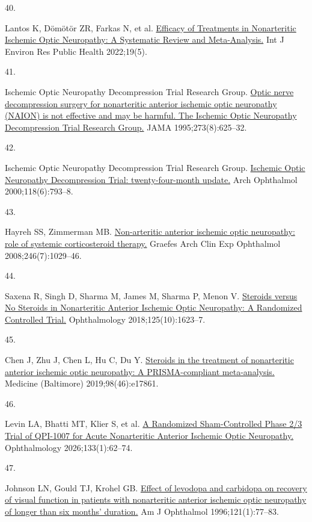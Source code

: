 \documentclass[
  11pt,
]{article}
\newlength{\cslhangindent}
\newlength{\csllabelwidth}
\newenvironment{CSLReferences}[2] %
 {\begin{list}{}{%
  \setlength{\itemindent}{0pt}
  \setlength{\leftmargin}{0pt}
  \setlength{\parsep}{0pt}
  \ifodd #1
   \setlength{\leftmargin}{\cslhangindent}
   \setlength{\itemindent}{-1\cslhangindent}
  \fi
  \setlength{\itemsep}{#2\baselineskip}}}
 {\end{list}}
\newcommand{\CSLLeftMargin}[1]{\parbox[t]{\csllabelwidth}{\strut#1\strut}}
\newcommand{\CSLRightInline}[1]{\parbox[t]{\linewidth - \csllabelwidth}{\strut#1\strut}}
\begin{document}
\begin{CSLReferences}{0}{1}
\CSLLeftMargin{40. }%
\CSLRightInline{Lantos K, Dömötör ZR, Farkas N, et al.
\href{https://doi.org/10.3390/ijerph19052718}{{Efficacy of Treatments in
Nonarteritic Ischemic Optic Neuropathy: A Systematic Review and
Meta-Analysis.}} Int J Environ Res Public Health 2022;19(5). }

\CSLLeftMargin{41. }%
\CSLRightInline{Ischemic Optic Neuropathy Decompression Trial Research
Group. \href{}{{Optic nerve decompression surgery for nonarteritic
anterior ischemic optic neuropathy (NAION) is not effective and may be
harmful. The Ischemic Optic Neuropathy Decompression Trial Research
Group.}} JAMA 1995;273(8):625--32. }

\CSLLeftMargin{42. }%
\CSLRightInline{Ischemic Optic Neuropathy Decompression Trial Research
Group. \href{}{{Ischemic Optic Neuropathy Decompression Trial:
twenty-four-month update.}} Arch Ophthalmol 2000;118(6):793--8. }

\CSLLeftMargin{43. }%
\CSLRightInline{Hayreh SS, Zimmerman MB.
\href{https://doi.org/10.1007/s00417-008-0805-8}{{Non-arteritic anterior
ischemic optic neuropathy: role of systemic corticosteroid therapy.}}
Graefes Arch Clin Exp Ophthalmol 2008;246(7):1029--46. }

\CSLLeftMargin{44. }%
\CSLRightInline{Saxena R, Singh D, Sharma M, James M, Sharma P, Menon V.
\href{https://doi.org/10.1016/j.ophtha.2018.03.032}{{Steroids versus No
Steroids in Nonarteritic Anterior Ischemic Optic Neuropathy: A
Randomized Controlled Trial.}} Ophthalmology 2018;125(10):1623--7. }

\CSLLeftMargin{45. }%
\CSLRightInline{Chen J, Zhu J, Chen L, Hu C, Du Y.
\href{https://doi.org/10.1097/MD.0000000000017861}{{Steroids in the
treatment of nonarteritic anterior ischemic optic neuropathy: A
PRISMA-compliant meta-analysis.}} Medicine (Baltimore)
2019;98(46):e17861. }

\CSLLeftMargin{46. }%
\CSLRightInline{Levin LA, Bhatti MT, Klier S, et al.
\href{https://doi.org/10.1016/j.ophtha.2025.07.039}{{A Randomized
Sham-Controlled Phase 2/3 Trial of QPI-1007 for Acute Nonarteritic
Anterior Ischemic Optic Neuropathy.}} Ophthalmology 2026;133(1):62--74.
}

\CSLLeftMargin{47. }%
\CSLRightInline{Johnson LN, Gould TJ, Krohel GB.
\href{https://doi.org/10.1016/s0002-9394(14)70536-7}{{Effect of levodopa
and carbidopa on recovery of visual function in patients with
nonarteritic anterior ischemic optic neuropathy of longer than six
months' duration.}} Am J Ophthalmol 1996;121(1):77--83. }


\end{CSLReferences}
\end{document}
